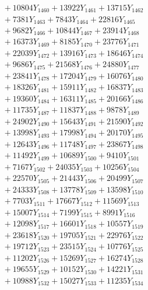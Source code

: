 \documentclass[a4paper,10pt]{article}
\begin{document}
{\begin{align}
&\;  + 10804 Y_{1460} + 13922 Y_{1461} + 13715 Y_{1462} \\[0.3ex]
&\;  + 7381 Y_{1463} + 7843 Y_{1464} + 22816 Y_{1465} \\[0.3ex]
&\;  + 9682 Y_{1466} + 10844 Y_{1467} + 23914 Y_{1468} \\[0.5ex]\allowbreak
&\;  + 16373 Y_{1469} + 8185 Y_{1470} + 23776 Y_{1471} \\[0.3ex]
&\;  + 22039 Y_{1472} + 13916 Y_{1473} + 18646 Y_{1474} \\[0.3ex]
&\;  + 9686 Y_{1475} + 21568 Y_{1476} + 24880 Y_{1477} \\[0.3ex]
&\;  + 23841 Y_{1478} + 17204 Y_{1479} + 16076 Y_{1480} \\[0.3ex]
&\;  + 18326 Y_{1481} + 15911 Y_{1482} + 16837 Y_{1483} \\[0.3ex]
&\;  + 19360 Y_{1484} + 16311 Y_{1485} + 20166 Y_{1486} \\[0.3ex]
&\;  + 11735 Y_{1487} + 11837 Y_{1488} + 9878 Y_{1489} \\[0.3ex]
&\;  + 24902 Y_{1490} + 15643 Y_{1491} + 21590 Y_{1492} \\[0.3ex]
&\;  + 13998 Y_{1493} + 17998 Y_{1494} + 20170 Y_{1495} \\[0.3ex]
&\;  + 12643 Y_{1496} + 11748 Y_{1497} + 23867 Y_{1498} \\[0.5ex]\allowbreak
&\;  + 11492 Y_{1499} + 10689 Y_{1500} + 9410 Y_{1501} \\[0.3ex]
&\;  + 7167 Y_{1502} + 24035 Y_{1503} + 10256 Y_{1504} \\[0.3ex]
&\;  + 22570 Y_{1505} + 21443 Y_{1506} + 20499 Y_{1507} \\[0.3ex]
&\;  + 24333 Y_{1508} + 13778 Y_{1509} + 13598 Y_{1510} \\[0.3ex]
&\;  + 7703 Y_{1511} + 17667 Y_{1512} + 11569 Y_{1513} \\[0.3ex]
&\;  + 15007 Y_{1514} + 7199 Y_{1515} + 8991 Y_{1516} \\[0.3ex]
&\;  + 12098 Y_{1517} + 16601 Y_{1518} + 10557 Y_{1519} \\[0.3ex]
&\;  + 23618 Y_{1520} + 19705 Y_{1521} + 22976 Y_{1522} \\[0.3ex]
&\;  + 19712 Y_{1523} + 23515 Y_{1524} + 10776 Y_{1525} \\[0.3ex]
&\;  + 11202 Y_{1526} + 15269 Y_{1527} + 16274 Y_{1528} \\[0.5ex]\allowbreak
&\;  + 19655 Y_{1529} + 10152 Y_{1530} + 14221 Y_{1531} \\[0.3ex]
&\;  + 10988 Y_{1532} + 15027 Y_{1533} + 11235 Y_{1534} \\[0.3ex]

\end{align}}
\end{document}
